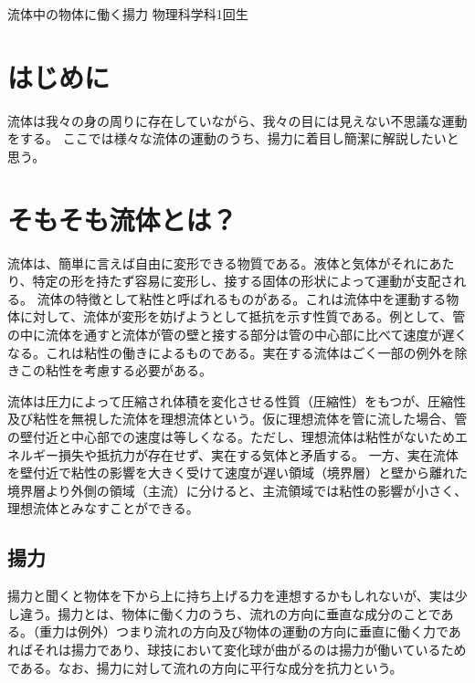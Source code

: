 \documentclass[10pt,b5paper,papersize,dvipdfmx]{jsbook}
\begin{document}


\kaishititle%
  {流体中の物体に働く揚力}%
  {物理科学科1回生}%
  {}%

%
\section*{はじめに}
流体は我々の身の周りに存在していながら、我々の目には見えない不思議な運動をする。
ここでは様々な流体の運動のうち、揚力に着目し簡潔に解説したいと思う。

\section{そもそも流体とは？}
流体は、簡単に言えば自由に変形できる物質である。液体と気体がそれにあたり、特定の形を持たず容易に変形し、接する固体の形状によって運動が支配される。
流体の特徴として粘性と呼ばれるものがある。これは流体中を運動する物体に対して、流体が変形を妨げようとして抵抗を示す性質である。例として、管の中に流体を通すと流体が管の壁と接する部分は管の中心部に比べて速度が遅くなる。これは粘性の働きによるものである。実在する流体はごく一部の例外を除きこの粘性を考慮する必要がある。
\par
流体は圧力によって圧縮され体積を変化させる性質（圧縮性）をもつが、圧縮性及び粘性を無視した流体を理想流体という。仮に理想流体を管に流した場合、管の壁付近と中心部での速度は等しくなる。ただし、理想流体は粘性がないためエネルギー損失や抵抗力が存在せず、実在する気体と矛盾する。
一方、実在流体を壁付近で粘性の影響を大きく受けて速度が遅い領域（境界層）と壁から離れた境界層より外側の領域（主流）に分けると、主流領域では粘性の影響が小さく、理想流体とみなすことができる。

\subsection{揚力}
揚力と聞くと物体を下から上に持ち上げる力を連想するかもしれないが、実は少し違う。揚力とは、物体に働く力のうち、流れの方向に垂直な成分のことである。（重力は例外）つまり流れの方向及び物体の運動の方向に垂直に働く力であればそれは揚力であり、球技において変化球が曲がるのは揚力が働いているためである。なお、揚力に対して流れの方向に平行な成分を抗力という。
\end{document}
